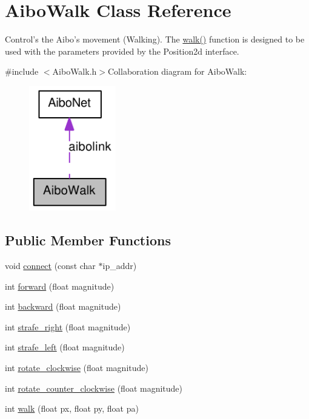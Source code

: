 \hypertarget{classAiboWalk}{
\section{AiboWalk Class Reference}
\label{classAiboWalk}
}


Control's the Aibo's movement (Walking). The \hyperlink{classAiboWalk_ace69bca076d0091769b1af5ca7636953}{walk()} function is designed to be used with the parameters provided by the Position2d interface.  


{\ttfamily \#include $<$AiboWalk.h$>$}Collaboration diagram for AiboWalk:\nopagebreak
\begin{figure}[H]
\begin{center}
\leavevmode
\includegraphics[width=107pt]{classAiboWalk__coll__graph}
\end{center}
\end{figure}
\subsection*{Public Member Functions}
\begin{DoxyCompactItemize}
\item 
void \hyperlink{classAiboWalk_a579e96df4e476be1232080d736f1cbf2}{connect} (const char $\ast$ip\_\-addr)
\item 
int \hyperlink{classAiboWalk_ad0af8173899889a2493657027100f7f8}{forward} (float magnitude)
\item 
int \hyperlink{classAiboWalk_a38821bc26f7140c31dfe72713a335fef}{backward} (float magnitude)
\item 
int \hyperlink{classAiboWalk_a092f290abad06d247dab8d4d602c5f73}{strafe\_\-right} (float magnitude)
\item 
int \hyperlink{classAiboWalk_a05599002238d8bf717655f2244a8d646}{strafe\_\-left} (float magnitude)
\item 
int \hyperlink{classAiboWalk_a5f4b9c1911e4486f13f45a7afb4d8d4a}{rotate\_\-clockwise} (float magnitude)
\item 
int \hyperlink{classAiboWalk_a93290f3abdbdbeb4482d91d0557f70ae}{rotate\_\-counter\_\-clockwise} (float magnitude)
\item 
int \hyperlink{classAiboWalk_ace69bca076d0091769b1af5ca7636953}{walk} (float px, float py, float pa)
\end{DoxyCompactItemize}


